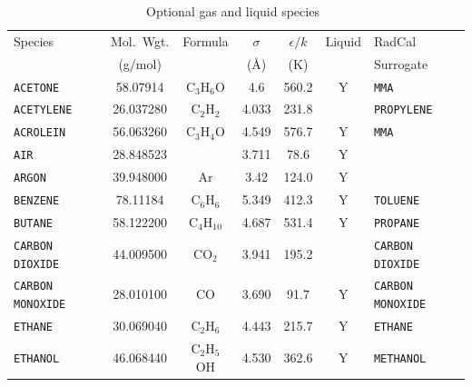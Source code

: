 \documentclass[11pt]{book}
\newcommand{\ct}{\tt\small}
\begin{document}
\begin{table}[p]
\begin{center}
\caption[Optional gas and liquid species]{Optional gas and liquid species~\cite{Reid:1}}
\label{tab:gasspecies}
\vspace{0.1in}
\begin{tabular}{|l|c|c|c|c|c|l|}
\hline
Species &   Mol.~Wgt.           & Formula          & $\sigma$ & $\epsilon/k$   & Liquid   & RadCal                          \\
        &   (g/mol)             &                  & (\AA)    & (K)            &          & Surrogate                       \\ \hline
\hline
{\ct ACETONE}            & 58.07914   & C$_3$H$_6$O      & 4.6      & 560.2    &  Y       &  {\ct MMA}                      \\ \hline
{\ct ACETYLENE}          & 26.037280  & C$_2$H$_2$       & 4.033    & 231.8    &          &  {\ct PROPYLENE}                \\ \hline
{\ct ACROLEIN}           & 56.063260  & C$_3$H$_4$O      & 4.549    & 576.7    &  Y       &  {\ct MMA}                      \\ \hline
{\ct AIR}                & 28.848523  &                  & 3.711    & 78.6     &  Y       &                                 \\ \hline
{\ct ARGON}              & 39.948000  & Ar               & 3.42     & 124.0    &  Y       &                                 \\ \hline
{\ct BENZENE}            & 78.11184   & C$_6$H$_6$       & 5.349    & 412.3    &  Y       &  {\ct TOLUENE}                  \\ \hline
{\ct BUTANE}             & 58.122200  & C$_4$H$_{10}$    & 4.687    & 531.4    &  Y       &  {\ct PROPANE}                  \\ \hline
{\ct CARBON DIOXIDE}     & 44.009500  & CO$_2$           & 3.941    & 195.2    &          &  {\ct CARBON DIOXIDE}           \\ \hline
{\ct CARBON MONOXIDE}    & 28.010100  & CO               & 3.690    & 91.7     &  Y       &  {\ct CARBON MONOXIDE}          \\ \hline
{\ct ETHANE}             & 30.069040  & C$_2$H$_6$       & 4.443    & 215.7    &  Y       &  {\ct ETHANE}                   \\ \hline
{\ct ETHANOL}            & 46.068440  & C$_2$H$_5$OH     & 4.530    & 362.6    &  Y       &  {\ct METHANOL}                 \\ \hline

\end{tabular}
\end{center}
\end{table}
\end{document}
